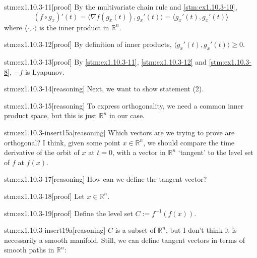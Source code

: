 \begin{stm}{stm:ex1.10.3-11}[proof]
By the multivariate chain rule and \ref{stm:ex1.10.3-10}, $$(f \circ g_x)'(t) = \langle \nabla f(g_x(t)), g_x'(t) \rangle = \langle g_x'(t), g_x'(t) \rangle$$ where $\langle \cdot, \cdot \rangle$ is the inner product in $\mathbb{R}^n$. 
\end{stm}

\begin{stm}{stm:ex1.10.3-12}[proof]
By definition of inner products, $\langle g_x'(t), g_x'(t) \rangle \ge 0$.
\end{stm}

\begin{stm}{stm:ex1.10.3-13}[proof]
By \ref{stm:ex1.10.3-11}, \ref{stm:ex1.10.3-12} and \ref{stm:ex1.10.3-8}, $-f$ is Lyapunov.
\end{stm}

\begin{stm}{stm:ex1.10.3-14}[reasoning]
Next, we want to show statement (2).
\end{stm}

\begin{stm}{stm:ex1.10.3-15}[reasoning]
To express orthogonality, we need a common inner product space, but this is just $\mathbb{R}^n$ in our case.
\end{stm}

\begin{stm}{stm:ex1.10.3-insert15a}[reasoning]
Which vectors are we trying to prove are orthogonal? I think, given some point $x \in \mathbb{R}^n$, we should compare the time derivative of the orbit of $x$ at $t=0$, with a vector in $\mathbb{R}^n$ ‘tangent’ to the level set of $f$ at $f(x)$.
\end{stm}

\begin{stm}{stm:ex1.10.3-17}[reasoning]
How can we define the tangent vector?
\end{stm}

\begin{stm}{stm:ex1.10.3-18}[proof]
Let $x \in \mathbb{R}^n$.
\end{stm}

\begin{stm}{stm:ex1.10.3-19}[proof]
Define the level set $C := f^{-1}(f(x))$.
\end{stm}

\begin{stm}{stm:ex1.10.3-insert19a}[reasoning]
$C$ is a subset of $\mathbb{R}^n$, but I don't think it is necessarily a smooth manifold. Still, we can define tangent vectors in terms of smooth paths in $\mathbb{R}^n$:
\end{stm}

